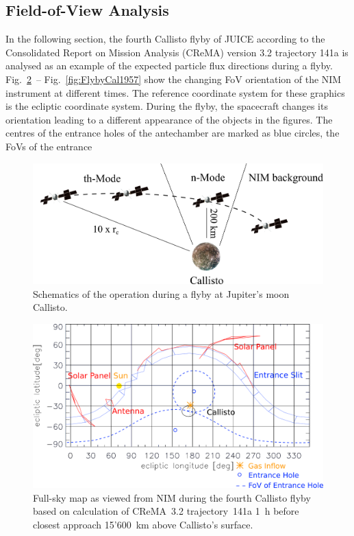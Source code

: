 	
	\subsection{Field-of-View Analysis}\label{subsubsec:Calfly}

	In the following section, the fourth Callisto flyby of JUICE according to the Consolidated Report on Mission Analysis (CReMA) version 3.2 trajectory 141a \cite{SOC_Crema3p2} is analysed as an example of the expected particle flux directions during a flyby. Fig.~\ref{fig:FlybyCal1852}~-- Fig.~\ref{fig:FlybyCal1957} show the changing FoV orientation of the NIM instrument at different times. The reference coordinate system for these graphics is the ecliptic coordinate system. During the flyby, the spacecraft changes its orientation leading to a different appearance of the objects in the figures. The centres of the entrance holes of the antechamber are marked as blue circles, the FoVs of the entrance 
		\begin{figure}[h!]
		\centering
		\includegraphics[width=.8\textwidth]{Bilder/Callisto_flyby_schematic.png}
		\caption{Schematics of the operation during a flyby at Jupiter's moon Callisto.}
		\label{fig:CalflybySchem}
	\end{figure}
	\begin{figure}[h!]
		\centering
		\includegraphics[width = .7\textwidth]{Bilder/NIM_pointing_2031JAN15185200.png}
		\caption{Full-sky map as viewed from NIM during the fourth Callisto flyby based on calculation of CReMA~3.2 trajectory~141a \cite{SOC_Crema3p2} 1~h before closest approach 15'600~km above Callisto's surface.}
		\label{fig:FlybyCal1852}
	\end{figure}
